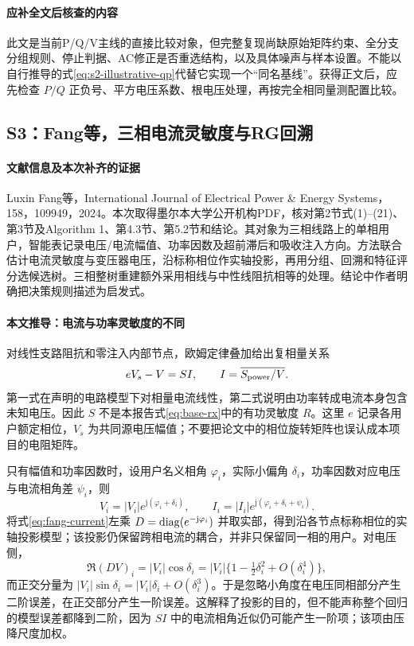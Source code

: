 \paragraph{应补全文后核查的内容}
此文是当前P/Q/V主线的直接比较对象，但完整复现尚缺原始矩阵约束、全分支分组规则、停止判据、AC修正是否重选结构，以及具体噪声与样本设置。不能以自行推导的式\eqref{eq:s2-illustrative-qp}代替它实现一个“同名基线”。获得正文后，应先检查 $P/Q$ 正负号、平方电压系数、根电压处理，再按完全相同量测配置比较。

\subsection{S3：Fang等，三相电流灵敏度与RG回溯}
\paragraph{文献信息及本次补齐的证据}
Luxin Fang等，International Journal of Electrical Power \& Energy Systems，158，109949，2024\citep{S3}。本次取得墨尔本大学公开机构PDF，核对第2节式(1)--(21)、第3节及Algorithm 1、第4.3节、第5.2节和结论。其对象为三相线路上的单相用户，智能表记录电压/电流幅值、功率因数及超前滞后和吸收注入方向。方法联合估计电流灵敏度与变压器电压，沿标称相位作实轴投影，再用分组、回溯和特征评分选候选树。三相整树重建额外采用相线与中性线阻抗相等的处理。结论中作者明确把决策规则描述为启发式。

\paragraph{本文推导：电流与功率灵敏度的不同}
对线性支路阻抗和零注入内部节点，欧姆定律叠加给出复相量关系
\begin{equation}
 eV_s-V=SI,\qquad I=\overline{S_{\rm power}/V}.
 \label{eq:fang-current}
\end{equation}
第一式在声明的电路模型下对相量电流线性，第二式说明由功率转成电流本身包含未知电压。因此 $S$ 不是本报告式\eqref{eq:base-rx}中的有功灵敏度 $R$。这里 $e$ 记录各用户额定相位，$V_s$ 为共同源电压幅值；不要把论文中的相位旋转矩阵也误认成本项目的电阻矩阵。

只有幅值和功率因数时，设用户名义相角 $\varphi_i$，实际小偏角 $\delta_i$，功率因数对应电压与电流相角差 $\psi_i$，则
\begin{equation}
 V_i=|V_i|e^{\mathrm j(\varphi_i+\delta_i)},\qquad
 I_i=|I_i|e^{\mathrm j(\varphi_i+\delta_i+\psi_i)}.
\end{equation}
将式\eqref{eq:fang-current}左乘 $D=\operatorname{diag}(e^{-\mathrm j\varphi_i})$ 并取实部，得到沿各节点标称相位的实轴投影模型；该投影仍保留跨相电流的耦合，并非只保留同一相的用户。对电压侧，
\begin{equation}
 \Re(DV)_i=|V_i|\cos\delta_i
 =|V_i|\{1-\tfrac12\delta_i^2+O(\delta_i^4)\},
\end{equation}
而正交分量为 $|V_i|\sin\delta_i=|V_i|\delta_i+O(\delta_i^3)$。于是忽略小角度在电压同相部分产生二阶误差，在正交部分产生一阶误差。这解释了投影的目的，但不能声称整个回归的模型误差都降到二阶，因为 $SI$ 中的电流相角近似仍可能产生一阶项；该项由压降尺度加权。

